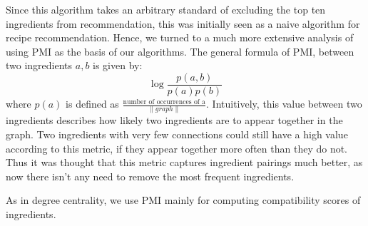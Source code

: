 \documentclass{acm_proc_article-sp}
\begin{document}
Since this algorithm takes an arbitrary standard of excluding the top ten ingredients from recommendation, this was initially seen as a naive algorithm for recipe recommendation. Hence, we turned to a much more extensive analysis of using
PMI as the basis of our algorithms. The general formula of PMI, between two ingredients $a,b$ is given by:
\[
	\log \frac{p(a,b)}{p(a)p(b)}
\]
where $p(a)$ is defined as $\frac{\text{number of occurrences of a}}{\|graph\|}$. Intuitively, this value between
two ingredients describes how likely two ingredients are to appear together in the graph. Two ingredients with very few connections could still have a high value according to this metric, if they appear together more often than they do not. Thus it was thought that this metric captures ingredient pairings much better, as now there isn't any need to remove the most frequent ingredients.

As in degree centrality, we use PMI mainly for computing compatibility scores of ingredients.
\end{document}
